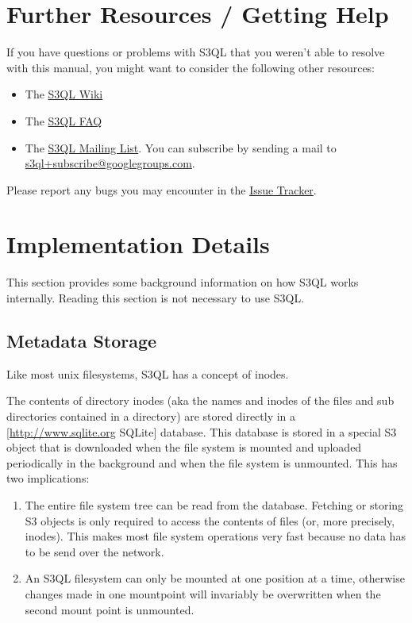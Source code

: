 \documentclass[letterpaper,10pt,english]{sphinxmanual}
\begin{document}
\chapter{Further Resources / Getting Help}
\label{resources::doc}\label{resources:further-resources-getting-help}\label{resources:resources}
If you have questions or problems with S3QL that you weren't able to
resolve with this manual, you might want to consider the following other resources:
\begin{itemize}
\item {} 
The \href{http://code.google.com/p/s3ql/w/list}{S3QL Wiki}

\item {} 
The \href{http://code.google.com/p/s3ql/wiki/FAQ}{S3QL FAQ}

\item {} 
The \href{http://groups.google.com/group/s3ql}{S3QL Mailing List}. You
can subscribe by sending a mail to
\href{mailto:s3ql+subscribe@googlegroups.com}{s3ql+subscribe@googlegroups.com}.

\end{itemize}

Please report any bugs you may encounter in the \href{http://code.google.com/p/s3ql/issues/list}{Issue Tracker}.


\chapter{Implementation Details}
\label{impl_details:implementation-details}\label{impl_details::doc}\label{impl_details:impl-details}
This section provides some background information on how S3QL works
internally. Reading this section is not necessary to use S3QL.


\section{Metadata Storage}
\label{impl_details:metadata-storage}
Like most unix filesystems, S3QL has a concept of inodes.

The contents of directory inodes (aka the names and inodes of the
files and sub directories contained in a directory) are stored
directly in a {[}\href{http://www.sqlite.org}{http://www.sqlite.org} SQLite{]} database. This database
is stored in a special S3 object that is downloaded when the file
system is mounted and uploaded periodically in the background and when
the file system is unmounted. This has two implications:
\begin{enumerate}
\item {} 
The entire file system tree can be read from the database. Fetching
or storing S3 objects is only required to access the contents of
files (or, more precisely, inodes). This makes most file system
operations very fast because no data has to be send over the
network.

\item {} 
An S3QL filesystem can only be mounted at one position at a time,
otherwise changes made in one mountpoint will invariably be
overwritten when the second mount point is unmounted.

\end{enumerate}
\end{document}
